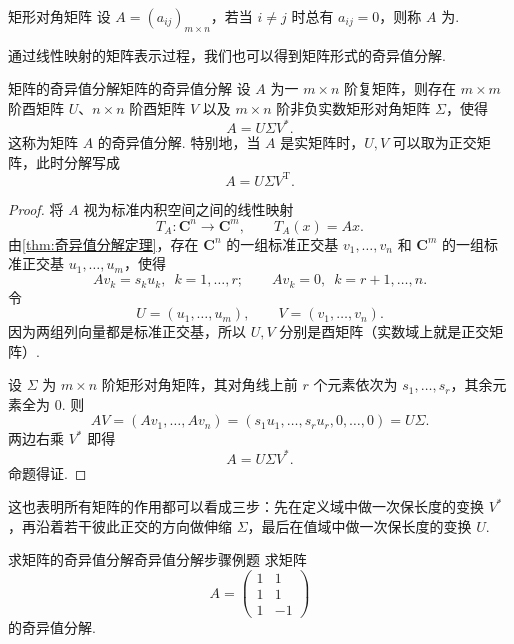 \begin{definition}{矩形对角矩阵}{} 
    设 $A = (a_{ij})_{m \times n}$，若当 $i \neq j$ 时总有 $a_{ij} = 0$，则称 $A$ 为.
\end{definition}

通过线性映射的矩阵表示过程，我们也可以得到矩阵形式的奇异值分解.

\begin{theorem}{矩阵的奇异值分解}{矩阵的奇异值分解}
    设 $A$ 为一 $m \times n$ 阶复矩阵，则存在 $m \times m$ 阶酉矩阵 $U$、$n \times n$ 阶酉矩阵 $V$ 以及 $m \times n$ 阶非负实数矩形对角矩阵 $\Sigma$，使得
    \[
        A = U \Sigma V^*.
    \]
    这称为矩阵 $A$ 的奇异值分解. 特别地，当 $A$ 是实矩阵时，$U, V$ 可以取为正交矩阵，此时分解写成
    \[
        A = U \Sigma V^{\mathrm{T}}.
    \]
\end{theorem}

\begin{proof}
    将 $A$ 视为标准内积空间之间的线性映射
    \[
        T_A : \mathbf{C}^n \to \mathbf{C}^m,\qquad T_A(x) = Ax.
    \]
    由\autoref{thm:奇异值分解定理}，存在 $\mathbf{C}^n$ 的一组标准正交基 $v_1, \ldots, v_n$ 和 $\mathbf{C}^m$ 的一组标准正交基 $u_1, \ldots, u_m$，使得
    \[
        Av_k = s_k u_k,\enspace k = 1, \ldots, r;\qquad Av_k = 0,\enspace k = r+1, \ldots, n.
    \]
    令
    \[
        U = (u_1, \ldots, u_m),\qquad V = (v_1, \ldots, v_n).
    \]
    因为两组列向量都是标准正交基，所以 $U, V$ 分别是酉矩阵（实数域上就是正交矩阵）.

    设 $\Sigma$ 为 $m \times n$ 阶矩形对角矩阵，其对角线上前 $r$ 个元素依次为 $s_1, \ldots, s_r$，其余元素全为 $0$. 则
    \[
        AV = (Av_1, \ldots, Av_n) = (s_1u_1, \ldots, s_ru_r, 0, \ldots, 0) = U\Sigma.
    \]
    两边右乘 $V^*$ 即得
    \[
        A = U\Sigma V^*.
    \]
    命题得证.
\end{proof}

这也表明所有矩阵的作用都可以看成三步：先在定义域中做一次保长度的变换 $V^*$，再沿着若干彼此正交的方向做伸缩 $\Sigma$，最后在值域中做一次保长度的变换 $U$.

\begin{example}{求矩阵的奇异值分解}{奇异值分解步骤例题}
    求矩阵
    \[
        A = \begin{pmatrix}
            1 & 1  \\
            1 & 1  \\
            1 & -1
        \end{pmatrix}
    \]
    的奇异值分解.
\end{example}

